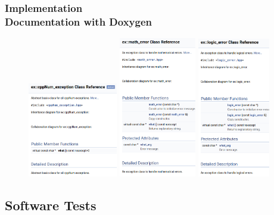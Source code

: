 \documentclass[ucs,10pt]{beamer}
\begin{document}
\begin{frame}
\frametitle{Implementation \\
        \small \color{rwth-blue} Documentation with Doxygen}
	\begin{figure}[b]
		\includegraphics[width=0.35\textwidth]{figures/ex::cppNum_exception_doc.png}
                \includegraphics[width=0.3\textwidth]{figures/ex::math_error_doc.png}
                \includegraphics[width=0.28\textwidth]{figures/ex::logic_error_doc.png}
        \end{figure}
\end{frame}

\subsection{Software Tests}
\end{document}

